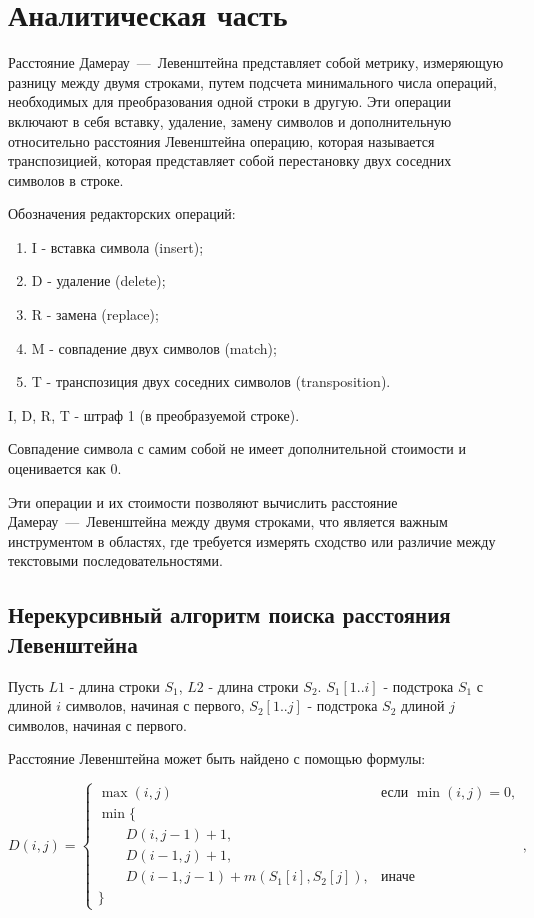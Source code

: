 \section{Аналитическая часть}

Расстояние Дамерау~---~Левенштейна представляет собой метрику, измеряющую разницу между двумя строками, путем подсчета минимального числа операций, необходимых для преобразования одной строки в другую.
Эти операции включают в себя вставку, удаление, замену символов и дополнительную относительно расстояния Левенштейна операцию, которая называется транспозицией, которая представляет собой перестановку двух соседних символов в строке. \cite{cyberleninka_modifitsirovannyi_algoritm}

Обозначения редакторских операций:
\begin{enumerate}
	\item I - вставка символа (insert);
	\item D - удаление (delete);
	\item R - замена (replace);
	\item M - совпадение двух символов (match);
	\item T - транспозиция двух соседних символов (transposition).
\end{enumerate}
I, D, R, T - штраф 1 (в преобразуемой строке).

Совпадение символа с самим собой не имеет дополнительной стоимости и оценивается как 0.

Эти операции и их стоимости позволяют вычислить расстояние Дамерау~---~Левенштейна между двумя строками, что является важным инструментом в областях, где требуется измерять сходство или различие между текстовыми последовательностями.

\subsection{Нерекурсивный алгоритм поиска расстояния Левенштейна}
Пусть $L1$ - длина строки $S_{1}$, $L2$ - длина строки $S_{2}$. 
$S_{1}[1..i]$ - подстрока $S_{1}$ с длиной $i$ символов, начиная с первого, $S_{2}[1..j]$ - подстрока $S_{2}$ длиной $j$ символов, начиная с первого. \cite{levenstein_book}

Расстояние Левенштейна может быть найдено с помощью формулы:

\begin{equation}
	\label{eq:d}
	D(i, j) = \begin{cases} 
		\max(i, j) &\text{если }\min(i, j) = 0, \\
		\min \lbrace \\
	     \qquad D(i, j-1) + 1, \\
	     \qquad D(i-1, j) + 1, \\
	     \qquad D(i-1, j-1) + m(S_{1}[i], S_{2}[j]), &\text{иначе} \\
	     \rbrace
	\end{cases},
\end{equation}


